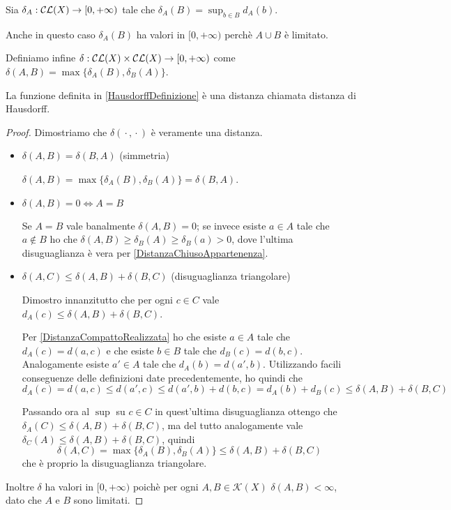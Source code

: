 \begin{definition}\label{DistanzaFraChiusi}
	Sia $\delta_A:\mathcal{CL}(X)\to [0,+\infty)$ tale che $\delta_A(B)=\sup_{b\in B} d_A(b)$.
\end{definition}
\begin{remark}
	Anche in questo caso $\delta_A(B)$ ha valori in $[0,+\infty)$ perchè $A\cup B$ è limitato.
\end{remark}

\begin{definition}\label{HausdorffDefinizione}
	Definiamo infine $\delta:\mathcal{CL}(X)\times \mathcal{CL}(X) \to [0,+\infty)$ come $\delta(A,B)=\max\{ \delta_A(B),\delta_B(A) \}$.
\end{definition}

\begin{theorem}
	La funzione definita in \cref{HausdorffDefinizione} è una distanza chiamata distanza di Hausdorff.
\end{theorem}

\begin{proof}
	Dimostriamo che $\delta({}\cdot{},{}\cdot{})$ è veramente una distanza.
	\begin{itemize}
		\item $\delta(A,B)=\delta(B,A)$ (simmetria)
		
		$\delta(A,B)=\max\{ \delta_A(B),\delta_B(A) \}=\delta(B,A)$.
		\item $\delta(A,B)=0 \iff A=B$
		
		Se $A=B$ vale banalmente $\delta(A,B)=0$; se invece esiste $a\in A$ tale che $a\not\in B$ ho che $\delta(A,B)\ge \delta_B(A)\ge \delta_B(a)>0$, dove l'ultima disuguaglianza è vera per \cref{DistanzaChiusoAppartenenza}.
		\item $\delta(A,C)\le \delta(A,B)+\delta(B,C)$ (disuguaglianza triangolare)
		
		Dimostro innanzitutto che per ogni $c\in C$ vale $d_A(c)\le \delta(A,B)+\delta(B,C)$.
		
 		Per \cref{DistanzaCompattoRealizzata} ho che esiste $a\in A$ tale che $d_A(c)=d(a,c)$ e che esiste $b\in B$ tale che $d_B(c)=d(b,c)$. Analogamente esiste $a'\in A$ tale che $d_A(b)=d(a',b)$. Utilizzando facili conseguenze delle definizioni date precedentemente, ho quindi che 
 		\begin{equation*}
 			d_A(c)=d(a,c)\le d(a',c) \le d(a',b)+d(b,c)=d_A(b)+d_B(c)\le \delta(A,B)+\delta(B,C)
 		\end{equation*}
 		
 		Passando ora al $\sup$ su $c\in C$ in quest'ultima disuguaglianza ottengo che $\delta_A(C)\le \delta(A,B)+\delta(B,C)$, ma del tutto  analogamente vale $\delta_C(A)\le \delta(A,B)+\delta(B,C)$, quindi
 		\begin{equation*}
 			\delta(A,C)=\max\{ \delta_A(B),\delta_B(A) \}\le \delta(A,B)+\delta(B,C)
 		\end{equation*}
		che è proprio la disuguaglianza triangolare.
	\end{itemize}
	Inoltre $\delta$ ha valori in $[0,+\infty)$ poichè per ogni $A,B\in \mathcal{K}(X)$ $\delta(A,B)<\infty$, dato che $A$ e $B$ sono limitati.
\end{proof}

